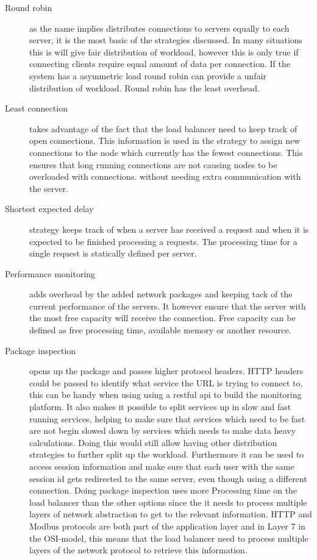 \begin{description}
	\item[Round robin] as the name implies distributes connections to servers equally to each server, it is the most basic of the strategies discussed. In many situations this is will give fair distribution of workload, however this is only true if connecting clients require equal amount of data per connection. If the system has a asymmetric load round robin can provide a unfair distribution of workload. 
	Round robin has the least overhead.
	
	\item[Least connection] takes advantage of the fact that the load balancer need to keep track of open connections. This information is used in the strategy to assign new connections to the node which currently has the fewest connections.
	This ensures that long running connections are not causing nodes to be overloaded with connections.
	without needing extra communication with the server.
	
	\item[Shortest expected delay] strategy keeps track of when a server has received a request and when it is expected to be finished processing a requests. The processing time for a single request is statically defined per server.
	
	\item[Performance monitoring] adds overhead by the added network packages and keeping tack of the current performance of the servers. It however ensure that the server with the most free capacity will receive the connection. Free capacity can be defined as free processing time, available memory or another resource.
	
	\item[Package inspection] opens up the package and passes higher protocol headers. HTTP headers could be passed to identify what service the URL is trying to connect to, this can be handy when using using a restful api to build the monitoring platform.
	It also makes it possible to split services up in slow and fast running services, helping to make sure that services which need to be fast are not begin slowed down by services which needs to make data heavy calculations.
	Doing this would still allow having other distribution strategies to further split up the workload.
	Furthermore it can be used to access session information and make sure that each user with the same session id gets redirected to the same server, even though using a different connection.
	Doing package inspection uses more Processing time on the load balancer than the other options since the it needs to process multiple layers of network abstraction to get to the relevant information. HTTP and Modbus protocols are both part of the application layer and in Layer 7 in the OSI-model, this means that the load balancer need to process multiple layers of the network protocol to retrieve this information. 
	
\end{description}

